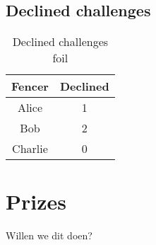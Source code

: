 \documentclass{article}
\begin{document}
\subsection{Declined challenges}
\begin{table}[ht]
    \centering
    \begin{tabular}{|c|c|}
        \hline
        Fencer & Declined \\ \hline
        Alice & 1 \\ \hline
        Bob & 2 \\ \hline
        Charlie & 0 \\ \hline
    \end{tabular}
    \caption{Declined challenges foil}
    \label{tab:challenges}
\end{table}
\section{Prizes}
Willen we dit doen?
\end{document}
